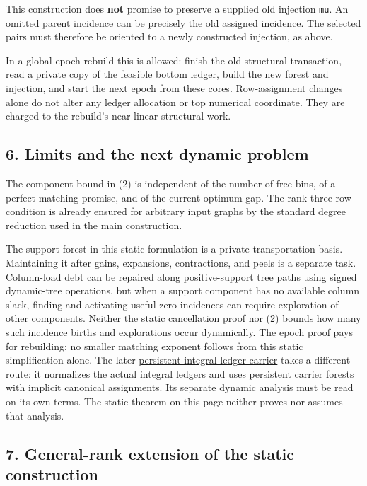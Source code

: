This construction does \textbf{not} promise to preserve a supplied old injection \texttt{mu}. An omitted parent incidence can be precisely the old assigned incidence. The selected pairs must therefore be oriented to a newly constructed injection, as above.

In a global epoch rebuild this is allowed: finish the old structural transaction, read a private copy of the feasible bottom ledger, build the new forest and injection, and start the next epoch from these cores. Row-assignment changes alone do not alter any ledger allocation or top numerical coordinate. They are charged to the rebuild's near-linear structural work.

\hypertarget{af-c467a6f0ad-limits-and-the-next-dynamic-problem}{%
\subsection{6. Limits and the next dynamic problem}\label{af-c467a6f0ad-limits-and-the-next-dynamic-problem}}

The component bound in (2) is independent of the number of free bins, of a perfect-matching promise, and of the current optimum gap. The rank-three row condition is already ensured for arbitrary input graphs by the standard degree reduction used in the main construction.

The support forest in this static formulation is a private transportation basis. Maintaining it after gains, expansions, contractions, and peels is a separate task. Column-load debt can be repaired along positive-support tree paths using signed dynamic-tree operations, but when a support component has no available column slack, finding and activating useful zero incidences can require exploration of other components. Neither the static cancellation proof nor (2) bounds how many such incidence births and explorations occur dynamically. The epoch proof pays for rebuilding; no smaller matching exponent follows from this static simplification alone. The later \href{https://github.com/icekylinx/algorithm-frontier/blob/main/manuscripts/graph-backends/persistent-integral-ledger-carrier.md}{persistent integral-ledger carrier} takes a different route: it normalizes the actual integral ledgers and uses persistent carrier forests with implicit canonical assignments. Its separate dynamic analysis must be read on its own terms. The static theorem on this page neither proves nor assumes that analysis.

\hypertarget{af-c467a6f0ad-general-rank-extension-of-the-static-construction}{%
\subsection{7. General-rank extension of the static construction}\label{af-c467a6f0ad-general-rank-extension-of-the-static-construction}}

